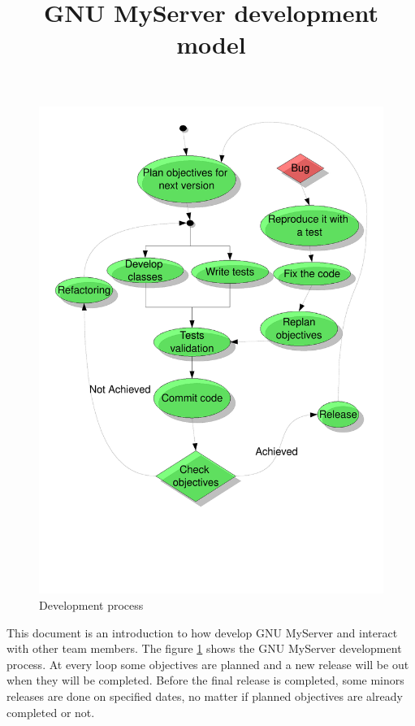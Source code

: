 \documentclass[12pt]{article}
\date{}
\author{}
\title{GNU MyServer development model}
\begin{document}
\maketitle
\thispagestyle{empty}

\newpage

\begin{figure}[H]
  \begin{center}
    \includegraphics[height=0.9\textheight]{dev_scheme}
  \end{center}
  \caption{Development process}
  \label{figure:dev_proc}
\end{figure}
This document is an introduction to how develop GNU MyServer and
interact with other team members.
The figure \ref{figure:dev_proc} shows the GNU MyServer development
process.
At every loop some objectives are planned and a new release will be
out when they will be completed.
Before the final release is completed, some minors releases are done
on specified dates, no matter if planned objectives are already
completed or not.
\end{document}
